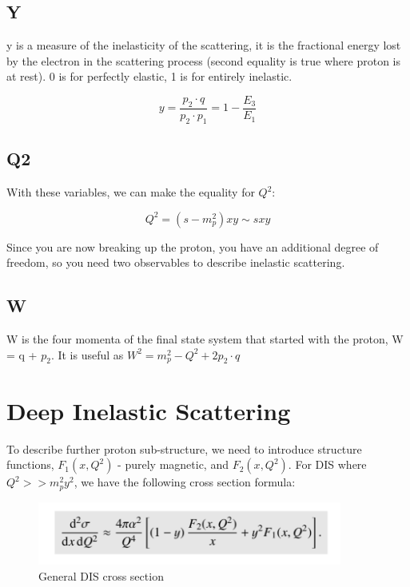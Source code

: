        
        \subsection{Y}
        y is a measure of the inelasticity of the scattering, it is the fractional energy lost by the electron in the scattering process (second equality is true where proton is at rest). 0 is for perfectly elastic, 1 is for entirely inelastic. 
        
        \begin{equation}
            y = \frac{p_2 \cdot q}{p_2 \cdot p_1} = 1 - \frac{E_3}{E_1}
        \end{equation}
        
        \subsection{Q2}
        With these variables, we can make the equality for $Q^2$:
        
          \begin{equation}
            Q^2 = (s-m_p^2)xy \sim sxy
        \end{equation}
        
        Since you are now breaking up the proton, you have an additional degree of freedom, so you need two observables to describe inelastic scattering. 
        

        \subsection{W}
            W is the four momenta of the final state system that started with the proton, W = q + $p_2$. It is useful as $W^2 = m_p^2 -Q^2 + 2 p_2 \cdot q$
        
    \section{Deep Inelastic Scattering}
        \indent To describe further proton sub-structure, we need to introduce structure functions, $F_1(x,Q^2)$ - purely magnetic, and $F_2(x,Q^2)$. For DIS where $Q^2 >> m_p^2y^2$, we have the following cross section formula:
        
        \begin{figure}[H]
            \centering
            \includegraphics[width=10cm]{NuclearPhysics/modules/lepton-scattering/pics/inelastic-ep/dis-xsection.PNG}
            \caption{General DIS cross section}
        \end{figure}
